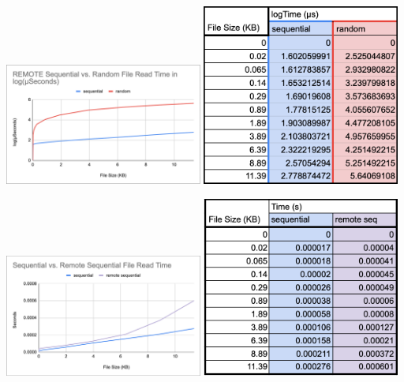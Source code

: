 \hspace{.25cm}

\includegraphics[width=6.5cm]{4.3 Results/my graph log micro.png}
\hspace{.5cm}
\includegraphics[width=6.5cm]{4.3 Results/table remote log micro.png}

\hspace{.25cm}

\includegraphics[width=6.5cm]{4.3 Results/s vs rs graph.png}
\hspace{.5cm}
\includegraphics[width=6.5cm]{4.3 Results/table s vs rs.png}

